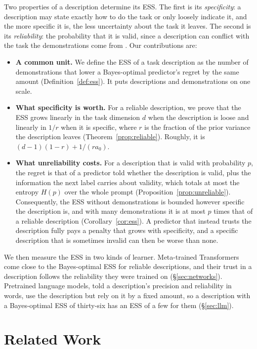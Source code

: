 \documentclass{article}
\begin{document}
Two properties of a description determine its ESS. The first is its \emph{specificity}: a description may state exactly how to do the task or only loosely indicate it, and the more specific it is, the less uncertainty about the task it leaves. The second is its \emph{reliability}: the probability that it is valid, since a description can conflict with the task the demonstrations come from \citep{evans2006}. Our contributions are:
\begin{itemize}
    \item \textbf{A common unit.} We define the ESS of a task description as the number of demonstrations that lower a Bayes-optimal predictor's regret by the same amount (Definition~\ref{def:ess}). It puts descriptions and demonstrations on one scale.
    \item \textbf{What specificity is worth.} For a reliable description, we prove that the ESS grows linearly in the task dimension $d$ when the description is loose and linearly in $1/r$ when it is specific, where $r$ is the fraction of the prior variance the description leaves (Theorem~\ref{prop:reliable}). Roughly, it is $(d-1)(1-r) + 1/(r a_0)$.
    \item \textbf{What unreliability costs.} For a description that is valid with probability $p$, the regret is that of a predictor told whether the description is valid, plus the information the next label carries about validity, which totals at most the entropy $H(p)$ over the whole prompt (Proposition~\ref{prop:unreliable}). Consequently, the ESS without demonstrations is bounded however specific the description is, and with many demonstrations it is at most $p$ times that of a reliable description (Corollary~\ref{cor:ess}). A predictor that instead trusts the description fully pays a penalty that grows with specificity, and a specific description that is sometimes invalid can then be worse than none.
\end{itemize}
We then measure the ESS in two kinds of learner. Meta-trained Transformers come close to the Bayes-optimal ESS for reliable descriptions, and their trust in a description follows the reliability they were trained on (\S\ref{sec:networks}). Pretrained language models, told a description's precision and reliability in words, use the description but rely on it by a fixed amount, so a description with a Bayes-optimal ESS of thirty-six has an ESS of a few for them (\S\ref{sec:llm}).

\section{Related Work}
\end{document}
